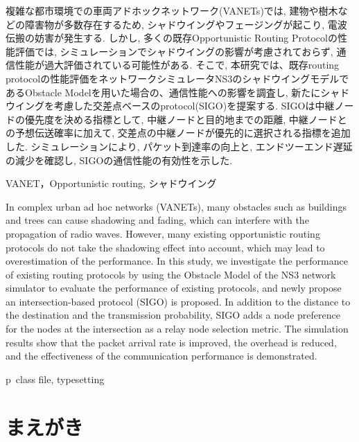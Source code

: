 \documentclass[technicalreport]{ieicej}
\begin{document}
\begin{jabstract}
 複雑な都市環境での車両アドホックネットワーク(VANETs)では, 建物や樹木などの障害物が多数存在するため, シャドウイングやフェージングが起こり, 電波伝搬の妨害が発生する. しかし, 多くの既存Opportunistic Routing Protocolの性能評価では, シミュレーションでシャドウイングの影響が考慮されておらず, 通信性能が過大評価されている可能性がある. そこで, 本研究では、既存routing protocolの性能評価をネットワークシミュレータNS3のシャドウイングモデルであるObstacle Modelを用いた場合の、通信性能への影響を調査し, 新たにシャドウイングを考慮した交差点ベースのprotocol(SIGO)を提案する. SIGOは中継ノードの優先度を決める指標として, 中継ノードと目的地までの距離, 中継ノードとの予想伝送確率に加えて, 交差点の中継ノードが優先的に選択される指標を追加した. シミュレーションにより, パケット到達率の向上と, エンドツーエンド遅延の減少を確認し, SIGOの通信性能の有効性を示した. 
\end{jabstract}
\begin{jkeyword}
VANET，Opportunistic routing, シャドウイング
\end{jkeyword}
\begin{eabstract}
In complex urban ad hoc networks (VANETs), many obstacles such as buildings and trees can cause shadowing and fading, which can interfere with the propagation of radio waves. However, many existing opportunistic routing protocols do not take the shadowing effect into account, which may lead to overestimation of the performance. In this study, we investigate the performance of existing routing protocols by using the Obstacle Model of the NS3 network simulator to evaluate the performance of existing protocols, and newly propose an intersection-based protocol (SIGO) is proposed. In addition to the distance to the destination and the transmission probability, SIGO adds a node preference for the nodes at the intersection as a relay node selection metric. The simulation results show that the packet arrival rate is improved, the overhead is reduced, and the effectiveness of the communication performance is demonstrated.
\end{eabstract}
\begin{ekeyword}
p\LaTeXe\ class file, typesetting
\end{ekeyword}
\maketitle

\section{まえがき}
\end{document}
